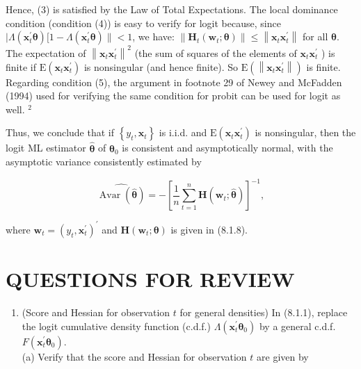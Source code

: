 \documentclass[10pt]{article}
\begin{document}
Hence, (3) is satisfied by the Law of Total Expectations. The local dominance condition (condition (4)) is easy to verify for logit because, since $\mid \Lambda\left(\mathbf{x}_{t}^{\prime} \boldsymbol{\theta}\right)[1- \Lambda\left(\mathbf{x}_{t}^{\prime} \boldsymbol{\theta}\right) \|<1$, we have: $\left\|\mathbf{H}_{t}\left(\mathbf{w}_{t} ; \boldsymbol{\theta}\right)\right\| \leq\left\|\mathbf{x}_{t} \mathbf{x}_{t}^{\prime}\right\|$ for all $\boldsymbol{\theta}$. The expectation of $\left\|\mathbf{x}_{t} \mathbf{x}_{t}^{\prime}\right\|^{2}$ (the sum of squares of the elements of $\mathbf{x}_{t} \mathbf{x}_{t}^{\prime}$ ) is finite if $\mathrm{E}\left(\mathbf{x}_{t} \mathbf{x}_{t}^{\prime}\right)$ is nonsingular (and hence finite). So $\mathrm{E}\left(\left\|\mathbf{x}_{t} \mathbf{x}_{t}^{\prime}\right\|\right)$ is finite. Regarding condition (5), the argument in footnote 29 of Newey and McFadden (1994) used for verifying the same condition for probit can be used for logit as well. ${ }^{2}$

Thus, we conclude that if $\left\{y_{t}, \mathbf{x}_{t}\right\}$ is i.i.d. and $\mathrm{E}\left(\mathbf{x}_{t} \mathbf{x}_{t}^{\prime}\right)$ is nonsingular, then the logit ML estimator $\hat{\boldsymbol{\theta}}$ of $\boldsymbol{\theta}_{0}$ is consistent and asymptotically normal, with the asymptotic variance consistently estimated by


\begin{equation*}
\widehat{\operatorname{Avar}(\hat{\boldsymbol{\theta}})}=-\left[\frac{1}{n} \sum_{t=1}^{n} \mathbf{H}\left(\mathbf{w}_{t} ; \hat{\boldsymbol{\theta}}\right)\right]^{-1}, \tag{8.1.13}
\end{equation*}


where $\mathbf{w}_{t}=\left(y_{t}, \mathbf{x}_{t}^{\prime}\right)^{\prime}$ and $\mathbf{H}\left(\mathbf{w}_{t} ; \boldsymbol{\theta}\right)$ is given in (8.1.8).

\section*{QUESTIONS FOR REVIEW}
\begin{enumerate}
  \item (Score and Hessian for observation $t$ for general densities) In (8.1.1), replace the logit cumulative density function (c.d.f.) $\Lambda\left(\mathbf{x}_{t}^{\prime} \boldsymbol{\theta}_{0}\right)$ by a general c.d.f. $F\left(\mathbf{x}_{t}^{\prime} \boldsymbol{\theta}_{0}\right)$.\\
(a) Verify that the score and Hessian for observation $t$ are given by
\end{enumerate}
\end{document}
